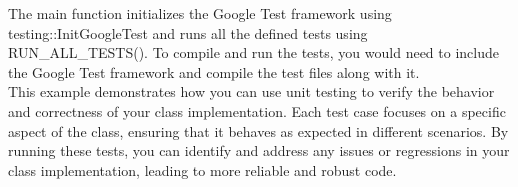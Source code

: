 \begin{solution}
    \noindent The main function initializes the Google Test framework using testing::InitGoogleTest and runs all the defined tests using RUN\_ALL\_TESTS(). To compile and run the tests, you would need to include the Google Test framework and compile the test files along with it. \\

    \noindent This example demonstrates how you can use unit testing to verify the behavior and correctness of your class implementation. Each test case focuses on a specific aspect of the class, ensuring that it behaves as expected in different scenarios. By running these tests, you can 
    identify and address any issues or regressions in your class implementation, leading to more reliable and robust code. \\
\end{solution}

